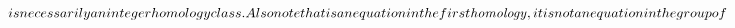 $$ is necessarily an integer homology class. Also note that is an equation in the first {\it homology}, it is not an equation in the group of $$